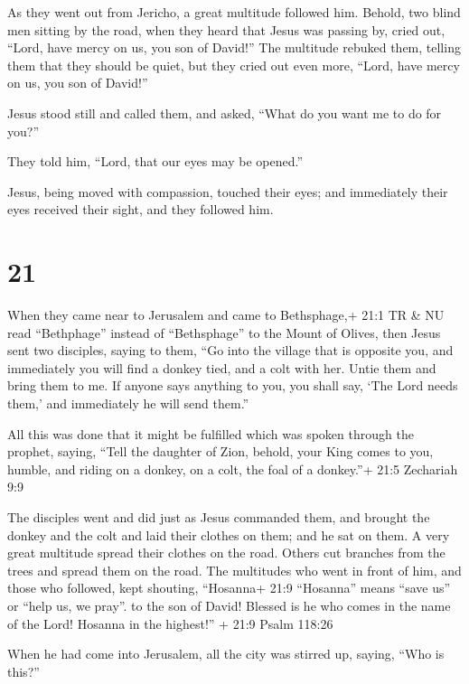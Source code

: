  As they went out from Jericho, a great multitude followed
him.  Behold, two blind men sitting by the road, when they
heard that Jesus was passing by, cried out, ``Lord, have mercy on us,
you son of David!''  The multitude rebuked them, telling
them that they should be quiet, but they cried out even more, ``Lord,
have mercy on us, you son of David!''

 Jesus stood still and called them, and asked, ``What do
you want me to do for you?''

 They told him, ``Lord, that our eyes may be opened.''

 Jesus, being moved with compassion, touched their eyes;
and immediately their eyes received their sight, and they followed him.

\hypertarget{section-20}{%
\section{21}\label{section-20}}

 When they came near to Jerusalem and came to Bethsphage,+
21:1 TR \& NU read ``Bethphage'' instead of ``Bethsphage'' to the Mount
of Olives, then Jesus sent two disciples,  saying to them,
``Go into the village that is opposite you, and immediately you will
find a donkey tied, and a colt with her. Untie them and bring them to
me.  If anyone says anything to you, you shall say, `The
Lord needs them,' and immediately he will send them.''

 All this was done that it might be fulfilled which was
spoken through the prophet, saying,  ``Tell the daughter of
Zion, behold, your King comes to you, humble, and riding on a donkey, on
a colt, the foal of a donkey.''+ 21:5 Zechariah 9:9

 The disciples went and did just as Jesus commanded them,
 and brought the donkey and the colt and laid their clothes
on them; and he sat on them.  A very great multitude spread
their clothes on the road. Others cut branches from the trees and spread
them on the road.  The multitudes who went in front of him,
and those who followed, kept shouting, ``Hosanna+ 21:9 ``Hosanna'' means
``save us'' or ``help us, we pray''. to the son of David! Blessed is he
who comes in the name of the Lord! Hosanna in the highest!'' + 21:9
Psalm 118:26

 When he had come into Jerusalem, all the city was stirred
up, saying, ``Who is this?''

